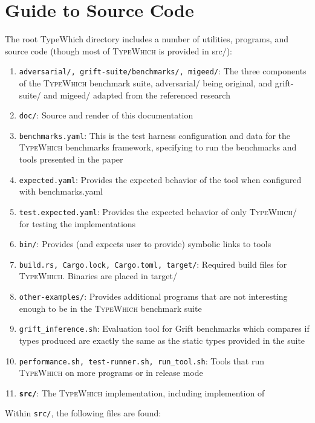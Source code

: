 \documentclass{book}
\newcommand{\system}{\textsc{TypeWhich}\xspace}
\begin{document}
\chapter{Guide to Source Code}

The root TypeWhich directory includes a number of utilities, programs, and
source code (though most of \system is provided in src/):

\begin{enumerate}
    \item \texttt{adversarial/, grift-suite/benchmarks/, migeed/}: The three
    components of the \system benchmark suite, adversarial/ being original, and
    grift-suite/ and migeed/ adapted from the referenced research
    \item \texttt{doc/}: Source and render of this documentation
    \item \texttt{benchmarks.yaml}: This is the test harness configuration and data
    for the \system benchmarks framework, specifying to run the benchmarks and
    tools presented in the paper
    \item \texttt{expected.yaml}: Provides the expected behavior of the tool when
    configured with benchmarks.yaml
    \item \texttt{test.expected.yaml}: Provides the expected behavior of only
    \system / \citet{rastogi:gti} for testing the implementations
    \item \texttt{bin/}: Provides (and expects user to provide) symbolic links to tools
    \item \texttt{build.rs, Cargo.lock, Cargo.toml, target/}: Required build files for
    \system. Binaries are placed in target/
    \item \texttt{other-examples/}: Provides additional programs that are not
    interesting enough to be in the \system benchmark suite
    \item \texttt{grift\_inference.sh}: Evaluation tool for Grift benchmarks
    which compares if types produced are exactly the same as the static types
    provided in the suite
    \item \texttt{performance.sh, test-runner.sh, run\_tool.sh}: Tools that run
    \system on more programs or in release mode
    \item \textbf{\texttt{src/}}: The \system implementation, including implemention of
    \citet{rastogi:gti}
\end{enumerate}

Within \texttt{src/}, the following files are found:
\end{document}
